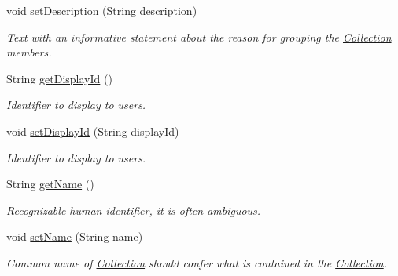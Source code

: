 \begin{DoxyCompactItemize}
void \hyperlink{interfaceorg_1_1sbolstandard_1_1core_1_1_collection_a1d15d718177c4f5411ce6ab339889fd4}{setDescription} (String description)
\begin{DoxyCompactList}\small\item\em Text with an informative statement about the reason for grouping the \hyperlink{interfaceorg_1_1sbolstandard_1_1core_1_1_collection}{Collection} members. \item\end{DoxyCompactList}\item 
String \hyperlink{interfaceorg_1_1sbolstandard_1_1core_1_1_collection_aefe76199cb4d0096f487b280c411d843}{getDisplayId} ()
\begin{DoxyCompactList}\small\item\em Identifier to display to users. \item\end{DoxyCompactList}\item 
void \hyperlink{interfaceorg_1_1sbolstandard_1_1core_1_1_collection_a46b93a70e7bd612a7b429aac4829bc88}{setDisplayId} (String displayId)
\begin{DoxyCompactList}\small\item\em Identifier to display to users. \item\end{DoxyCompactList}\item 
String \hyperlink{interfaceorg_1_1sbolstandard_1_1core_1_1_collection_a78ee178b6a73658d65ca60da4d1e6683}{getName} ()
\begin{DoxyCompactList}\small\item\em Recognizable human identifier, it is often ambiguous. \item\end{DoxyCompactList}\item 
void \hyperlink{interfaceorg_1_1sbolstandard_1_1core_1_1_collection_ad737b36b74be994e0d8420797ed72f78}{setName} (String name)
\begin{DoxyCompactList}\small\item\em Common name of \hyperlink{interfaceorg_1_1sbolstandard_1_1core_1_1_collection}{Collection} should confer what is contained in the \hyperlink{interfaceorg_1_1sbolstandard_1_1core_1_1_collection}{Collection}. \item\end{DoxyCompactList}\end{DoxyCompactItemize}


